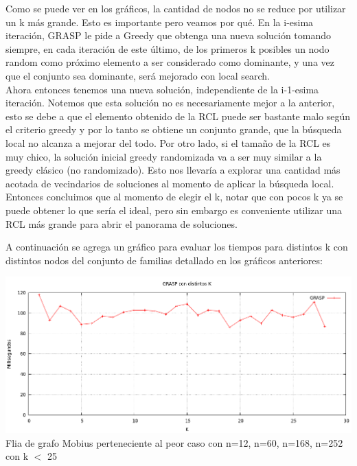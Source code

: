 Como se puede ver en los gráficos, la cantidad de nodos no se reduce por utilizar un k más grande. Esto es importante pero veamos por qué.
En la i-esima iteración, GRASP le pide a Greedy que obtenga una nueva solución tomando siempre, en cada iteración de este último, de los primeros k posibles un nodo random como 
próximo elemento a ser considerado como dominante, y una vez que el conjunto sea dominante, será mejorado con local search.\\
Ahora entonces tenemos una nueva solución, independiente de la i-1-esima iteración. Notemos que esta solución no es necesariamente mejor a la anterior, 
esto se debe a que el elemento obtenido de la RCL puede ser bastante malo según el criterio greedy y por lo
tanto se obtiene un conjunto grande, que la búsqueda local no alcanza a mejorar del todo. Por otro lado, si el tamaño de la
RCL es muy chico, la solución inicial greedy randomizada va a ser muy similar a la greedy clásico (no randomizado). Esto nos
llevaría a explorar una cantidad más acotada de vecindarios de soluciones al momento de aplicar la búsqueda local.
Entonces concluimos que al momento de elegir el k, notar que con pocos k ya se puede obtener lo que sería el ideal, pero sin embargo es conveniente utilizar una RCL
más grande para abrir el panorama de soluciones.

A continuación se agrega un gráfico para evaluar los tiempos para distintos k con distintos nodos del conjunto de familias detallado en los gráficos anteriores:


\begin{center}
\includegraphics[width=17cm]{./graficos/GRASP_distintosK.png}\\
Flia de grafo Mobius perteneciente al peor caso con n=12, n=60, n=168, n=252 con k $<$ 25
\end{center}

